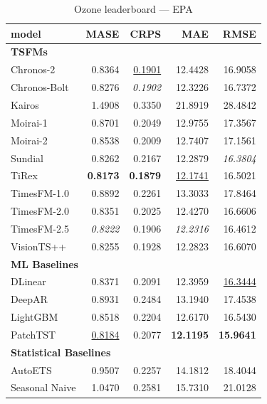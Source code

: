 \begin{table}[H]
\caption{Ozone leaderboard --- EPA}
\centering
\begin{small}
\begin{tabular}{lrrrr}
\toprule
model & MASE & CRPS & MAE & RMSE \\
\midrule
\multicolumn{5}{l}{\textbf{TSFMs}} \\
Chronos-2 & 0.8364 & \underline{0.1901} & 12.4428 & 16.9058 \\
Chronos-Bolt & 0.8276 & \textit{0.1902} & 12.3226 & 16.7372 \\
Kairos & 1.4908 & 0.3350 & 21.8919 & 28.4842 \\
Moirai-1 & 0.8701 & 0.2049 & 12.9755 & 17.3567 \\
Moirai-2 & 0.8538 & 0.2009 & 12.7407 & 17.1561 \\
Sundial & 0.8262 & 0.2167 & 12.2879 & \textit{16.3804} \\
TiRex & \textbf{0.8173} & \textbf{0.1879} & \underline{12.1741} & 16.5021 \\
TimesFM-1.0 & 0.8892 & 0.2261 & 13.3033 & 17.8464 \\
TimesFM-2.0 & 0.8351 & 0.2025 & 12.4270 & 16.6606 \\
TimesFM-2.5 & \textit{0.8222} & 0.1906 & \textit{12.2316} & 16.4612 \\
VisionTS++ & 0.8255 & 0.1928 & 12.2823 & 16.6070 \\
\midrule
\multicolumn{5}{l}{\textbf{ML Baselines}} \\
DLinear & 0.8371 & 0.2091 & 12.3959 & \underline{16.3444} \\
DeepAR & 0.8931 & 0.2484 & 13.1940 & 17.4538 \\
LightGBM & 0.8518 & 0.2204 & 12.6170 & 16.5430 \\
PatchTST & \underline{0.8184} & 0.2077 & \textbf{12.1195} & \textbf{15.9641} \\
\midrule
\multicolumn{5}{l}{\textbf{Statistical Baselines}} \\
AutoETS & 0.9507 & 0.2257 & 14.1812 & 18.4044 \\
Seasonal Naive & 1.0470 & 0.2581 & 15.7310 & 21.0128 \\
\bottomrule
\end{tabular}
\end{small}
\end{table}